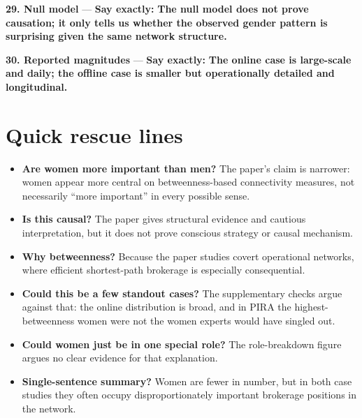 \documentclass[11pt,a4paper]{article}
\begin{document}
\textbf{29. Null model} --- \textbf{Say exactly:} \textbf{The null model does not prove causation; it only tells us whether the observed gender pattern is surprising given the same network structure.}

\textbf{30. Reported magnitudes} --- \textbf{Say exactly:} \textbf{The online case is large-scale and daily; the offline case is smaller but operationally detailed and longitudinal.}

\section*{Quick rescue lines}
\begin{itemize}
\item \textbf{Are women more important than men?} The paper’s claim is narrower: women appear more central on betweenness-based connectivity measures, not necessarily “more important” in every possible sense.
\item \textbf{Is this causal?} The paper gives structural evidence and cautious interpretation, but it does not prove conscious strategy or causal mechanism.
\item \textbf{Why betweenness?} Because the paper studies covert operational networks, where efficient shortest-path brokerage is especially consequential.
\item \textbf{Could this be a few standout cases?} The supplementary checks argue against that: the online distribution is broad, and in PIRA the highest-betweenness women were not the women experts would have singled out.
\item \textbf{Could women just be in one special role?} The role-breakdown figure argues no clear evidence for that explanation.
\item \textbf{Single-sentence summary?} Women are fewer in number, but in both case studies they often occupy disproportionately important brokerage positions in the network.
\end{itemize}
\end{document}
